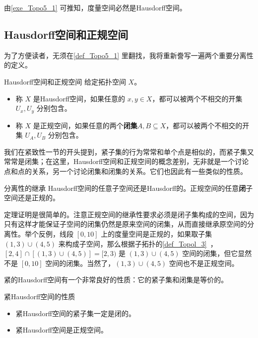 \begin{corollary}{}
由\autoref{exe_Topo5_1} 可推知，度量空间必然是Hausdorff空间。
\end{corollary}

\subsection{Hausdorff空间和正规空间}

为了方便读者，无须在\autoref{def_Topo5_1} 里翻找，我将重新誊写一遍两个重要分离性的定义。

\begin{definition}{Hausdorff空间和正规空间}\label{def_Topo5_2}
给定拓扑空间 $X$。
\begin{itemize}
\item 称 $X$ 是Hausdorff空间，如果任意的 $x,y\in X$，都可以被两个不相交的开集 $U_x, U_y$ 分别包含。
\item 称 $X$ 是正规空间，如果任意的两个\textbf{闭集}$A, B\subseteq X$，都可以被两个不相交的开集 $U_A, U_B$ 分别包含。
\end{itemize}
\end{definition}

我们在紧致性一节的开头提到，紧子集的行为常常和单个点是相似的，而紧子集又常常是闭集；在这里，Hausdorff空间和正规空间的概念差别，无非就是一个讨论点和点的关系，另一个讨论闭集和闭集的关系。它们也因此有一些类似的性质。

\begin{theorem}{分离性的继承}
Hausdorff空间的任意子空间还是Hausdorff的。正规空间的任意\textbf{闭}子空间还是正规的。
\end{theorem}

定理证明是很简单的。注意正规空间的继承性要求必须是闭子集构成的空间，因为只有这样才能保证子空间的闭集仍然是原来空间的闭集，从而直接继承原空间的分离性。举个反例，线段 $[0,10]$ 上的度量空间是正规的，如果取子集 $(1,3)\cup(4,5)$ 来构成子空间，那么根据子拓扑的\autoref{def_Topol_3}~，$[2,4]\cap[(1,3)\cup(4,5)]=[2,3)$ 是 $(1,3)\cup(4,5)$ 空间的闭集，但它显然不是 $[0,10]$ 空间的闭集。当然了，$(1,3)\cup(4,5)$ 空间也不是正规空间。

紧的Hausdorff空间有一个非常良好的性质：它的紧子集和闭集是等价的。
\begin{theorem}{紧Hausdorff空间的性质}
\begin{itemize}
\item 紧Hausdorff空间的紧子集一定是闭的。
\item 紧Hausdorff空间是正规空间。

\end{itemize}
\end{theorem}

